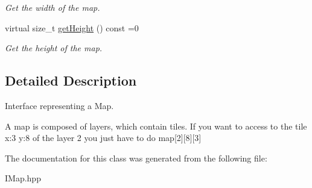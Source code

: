 \begin{DoxyCompactItemize}
\begin{DoxyCompactList}\small\item\em Get the width of the map. \end{DoxyCompactList}\item 
\mbox{\label{classarcade_1_1IMap_a9282ac731fa61b8c18241a309efbd6a0}} 
virtual size\+\_\+t \hyperlink{classarcade_1_1IMap_a9282ac731fa61b8c18241a309efbd6a0}{get\+Height} () const =0
\begin{DoxyCompactList}\small\item\em Get the height of the map. \end{DoxyCompactList}\end{DoxyCompactItemize}


\subsection{Detailed Description}
Interface representing a Map. 

A map is composed of layers, which contain tiles. If you want to access to the tile x\+:3 y\+:8 of the layer 2 you just have to do map\mbox{[}2\mbox{]}\mbox{[}8\mbox{]}\mbox{[}3\mbox{]} 

The documentation for this class was generated from the following file\+:\begin{DoxyCompactItemize}
\item 
I\+Map.\+hpp\end{DoxyCompactItemize}
